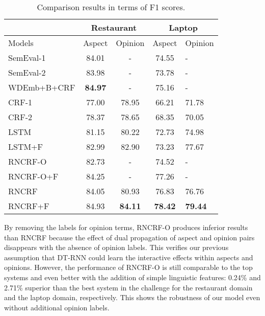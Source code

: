 \documentclass[11pt,letterpaper]{article}
\begin{document}
\begin{table}
\footnotesize
	\begin{center}
		\begin{tabular}{p{2.2cm}|c|c|c|p{1cm}}
			\hline
			\hline & \multicolumn{2}{c|}{Restaurant} & \multicolumn{2}{c}{Laptop} \\
			\hline Models & Aspect & Opinion & Aspect & Opinion \\
            \hline SemEval-1 & 84.01 & - & 74.55 & - \\
			\hline SemEval-2 & 83.98 & - & 73.78 & - \\
\hline WDEmb+B+CRF & \bf{84.97} & - & 75.16 & - \\
			\hline CRF-1 & 77.00 & 78.95 & 66.21 & 71.78 \\
			\hline CRF-2 & 78.37 & 78.65 & 68.35 & 70.05 \\
			\hline LSTM & 81.15 & 80.22 & 72.73 & 74.98 \\
            \hline LSTM+F & 82.99 & 82.90 & 73.23 & 77.67 \\
            \hline
			\hline RNCRF-O & 82.73 & - & 74.52 & - \\
			\hline RNCRF-O+F & 84.25 & - & 77.26 & - \\
			\hline RNCRF & 84.05 & 80.93 & 76.83 & 76.76 \\
			\hline
			RNCRF+F & 84.93 & \bf{84.11} & \bf{78.42} & \bf{79.44} \\
			\hline
		\end{tabular}
		\caption{Comparison results in terms of F1 scores.}\label{tbl:comparison}
	\end{center}
\end{table}


By removing the labels for opinion terms, RNCRF-O produces inferior results than RNCRF because the effect of dual propagation of aspect and opinion pairs disappears with the absence of opinion labels. This verifies our previous assumption that DT-RNN could learn the interactive effects within aspects and opinions. However, the performance of RNCRF-O is still comparable to the top systems and even better with the addition of simple linguistic features: 0.24\% and 2.71\% superior than the best system in the challenge for the restaurant domain and the laptop domain, respectively. This shows the robustness of our model even without additional opinion labels.
\end{document}
